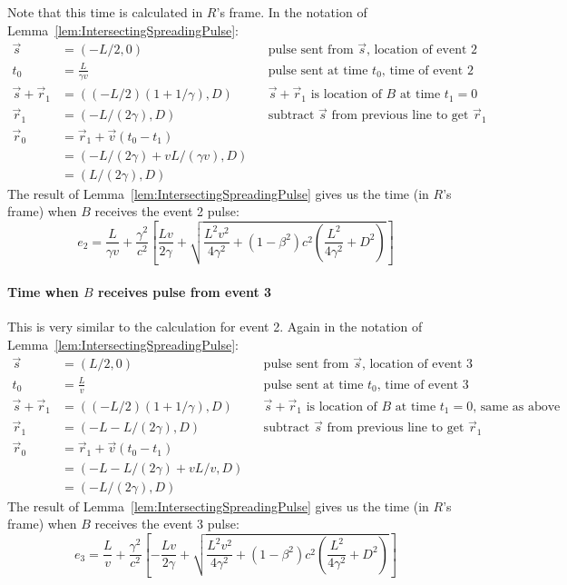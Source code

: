 \documentclass[a4paper]{article}
\theoremstyle{plain}
\theoremstyle{definition}
\newcommand{\vect}[1]{\vec{#1}}
\begin{document}
Note that this time is calculated in $R$'s frame.
In the notation of Lemma~\ref{lem:IntersectingSpreadingPulse}:
\begin{align*}
\vect{s} & = (-L/2, 0) & & \text{pulse sent from $\vect{s}$, location of event 2} \\
t_0 & = \frac{L}{\gamma v} & & \text{pulse sent at time $t_0$, time of event 2} \\
\vect{s} + \vect{r}_1 & = ((-L/2)(1+1/\gamma), D) & & \text{$\vect{s}+\vect{r}_1$ is location of $B$ at time $t_1=0$} \\
\vect{r}_1 & = (-L/(2 \gamma), D) & & \text{subtract $\vect{s}$ from previous line to get $\vect{r}_1$} \\
\vect{r}_0 & = \vect{r}_1 + \vect{v}(t_0-t_1) \\
           & = (-L/(2 \gamma) + vL/(\gamma v), D) \\
           & = (L/(2 \gamma), D)
\end{align*}
The result of Lemma~\ref{lem:IntersectingSpreadingPulse} gives us the
time (in $R$'s frame) when $B$ receives the event 2 pulse:
\begin{equation}
  e_2 = \frac{L}{\gamma v} +
        \frac{\gamma^2}{c^2} \left[ \frac{Lv}{2 \gamma} + \sqrt{ \frac{L^2v^2}{4 \gamma^2} + (1-\beta^2)c^2 (\frac{L^2}{4 \gamma^2} + D^2) } \right]
\label{eqn:Breceivespulse2}
\end{equation}

\paragraph{Time when $B$ receives pulse from event 3}

This is very similar to the calculation for event 2.
Again in the notation of Lemma~\ref{lem:IntersectingSpreadingPulse}:
\begin{align*}
\vect{s} & = (L/2, 0) & & \text{pulse sent from $\vect{s}$, location of event 3} \\
t_0 & = \frac{L}{v} & & \text{pulse sent at time $t_0$, time of event 3} \\
\vect{s} + \vect{r}_1 & = ((-L/2)(1+1/\gamma), D) & & \text{$\vect{s}+\vect{r}_1$ is location of $B$ at time $t_1=0$, same as above} \\
\vect{r}_1 & = (-L - L/(2 \gamma), D) & & \text{subtract $\vect{s}$ from previous line to get $\vect{r}_1$} \\
\vect{r}_0 & = \vect{r}_1 + \vect{v}(t_0-t_1) \\
           & = (-L - L/(2 \gamma) + vL/v, D) \\
           & = (-L/(2 \gamma), D)
\end{align*}
The result of Lemma~\ref{lem:IntersectingSpreadingPulse} gives us the
time (in $R$'s frame) when $B$ receives the event 3 pulse:
\begin{equation}
  e_3 = \frac{L}{v} +
        \frac{\gamma^2}{c^2} \left[ -\frac{Lv}{2 \gamma} + \sqrt{ \frac{L^2v^2}{4 \gamma^2} + (1-\beta^2)c^2 (\frac{L^2}{4 \gamma^2} + D^2) } \right]
\label{eqn:Breceivespulse3}
\end{equation}
\end{document}

